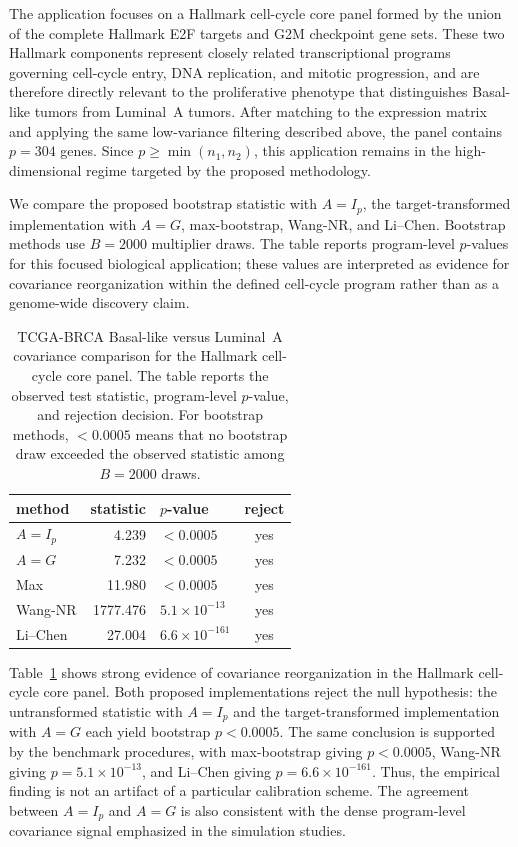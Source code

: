 \documentclass[
  12pt]{article}
\theoremstyle{plain}
\theoremstyle{definition}
\theoremstyle{remark}
\begin{document}
The application focuses on a Hallmark cell-cycle core panel formed by the union of the complete Hallmark E2F targets and G2M checkpoint gene sets.  These two Hallmark components represent closely related transcriptional programs governing cell-cycle entry, DNA replication, and mitotic progression, and are therefore directly relevant to the proliferative phenotype that distinguishes Basal-like tumors from Luminal~A tumors.  After matching to the expression matrix and applying the same low-variance filtering described above, the panel contains \(p=304\) genes.  Since \(p\ge \min(n_1,n_2)\), this application remains in the high-dimensional regime targeted by the proposed methodology.

We compare the proposed bootstrap statistic with \(A=I_p\), the target-transformed implementation with \(A=G\), max-bootstrap, Wang-NR, and Li--Chen.  Bootstrap methods use \(B=2000\) multiplier draws.  The table reports program-level \(p\)-values for this focused biological application; these values are interpreted as evidence for covariance reorganization within the defined cell-cycle program rather than as a genome-wide discovery claim.

\begin{table}[!htbp]
\centering
\footnotesize
\caption{TCGA-BRCA Basal-like versus Luminal~A covariance comparison for the Hallmark cell-cycle core panel.  The table reports the observed test statistic, program-level \(p\)-value, and rejection decision.  For bootstrap methods, \(<0.0005\) means that no bootstrap draw exceeded the observed statistic among \(B=2000\) draws.}
\label{tab:tcga_realdata_programs}
\begin{tabular}{@{}lrlc@{}}
\toprule
method & statistic & \(p\)-value & reject \\
\midrule
\(A=I_p\) & 4.239 & \(<0.0005\) & yes \\
\(A=G\) & 7.232 & \(<0.0005\) & yes \\
Max & 11.980 & \(<0.0005\) & yes \\
Wang-NR & 1777.476 & \(5.1\times 10^{-13}\) & yes \\
Li--Chen & 27.004 & \(6.6\times 10^{-161}\) & yes \\
\bottomrule
\end{tabular}
\end{table}

Table~\ref{tab:tcga_realdata_programs} shows strong evidence of covariance reorganization in the Hallmark cell-cycle core panel.  Both proposed implementations reject the null hypothesis: the untransformed statistic with \(A=I_p\) and the target-transformed implementation with \(A=G\) each yield bootstrap \(p<0.0005\).  The same conclusion is supported by the benchmark procedures, with max-bootstrap giving \(p<0.0005\), Wang-NR giving \(p=5.1\times 10^{-13}\), and Li--Chen giving \(p=6.6\times 10^{-161}\).  Thus, the empirical finding is not an artifact of a particular calibration scheme.  The agreement between \(A=I_p\) and \(A=G\) is also consistent with the dense program-level covariance signal emphasized in the simulation studies.
\end{document}
